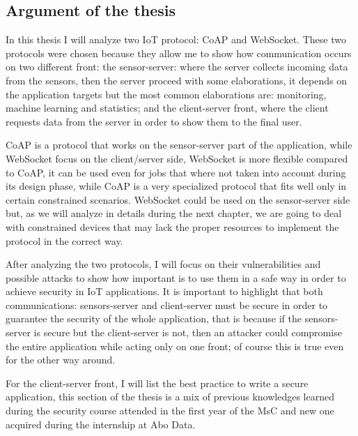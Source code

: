 	\subsection{Argument of the thesis}
	
	In this thesis I will analyze two IoT protocol: CoAP and WebSocket.\newline
	These two protocols were chosen because they allow me to show how communication occurs on two different front:
	the sensor-server: where the server collects incoming data from the sensors, then the server proceed with some elaborations, it depends on the application targets but the most common elaborations are: monitoring, machine learning and statistics; and the client-server front, where the client requests data from the server in order to show them to
	the final user.\newline

	CoAP is a protocol that works on the sensor-server part of the application, while WebSocket focus
	on the client/server side, WebSocket is more flexible compared to CoAP, it can be used even for
	jobs that where not taken into account during its design phase, while CoAP is a very specialized
	protocol that fits well only in certain constrained scenarios.\newline
	WebSocket could be used on the sensor-server side but, as we will analyze in details during the next chapter,
	we are going to deal with constrained devices that may lack the proper resources to implement the protocol in the correct way.\newline
	
	After analyzing the two protocols, I will focus on their vulnerabilities and possible attacks to show
	how important is to use them in a safe way in order to achieve security in IoT applications.\newline
	It is important to highlight that both communications: sensors-server and client-server must be secure in order to guarantee
	the security of the whole application, that is because if the sensors-server is secure but the client-server is not, then an
	attacker could compromise the entire application while acting only on one front; of course this is true even for the other way around.\newline
	
	For the client-server front, I will list the best practice to write a secure application, this section of the thesis
	is a mix of previous knowledges learned during the security course attended in the first year of the MsC and new one
	acquired during the internship at Abo Data.\newline
	
